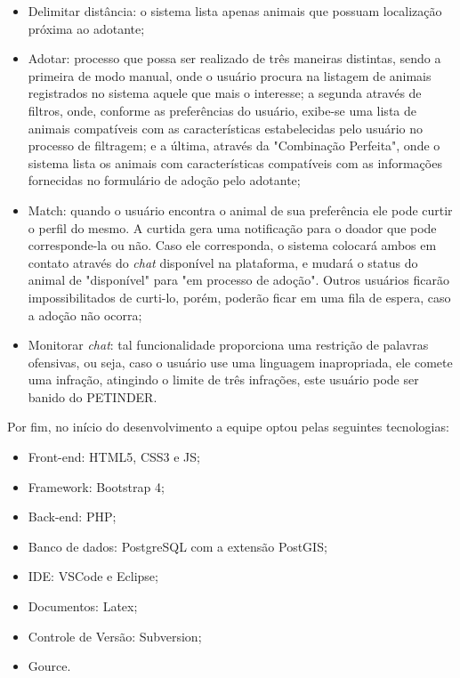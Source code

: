 \begin{itemize}

\item Delimitar distância: o sistema lista apenas animais que possuam localização próxima ao adotante;

\item Adotar: processo que possa ser realizado de três maneiras distintas, sendo a primeira de modo manual, onde o usuário procura na listagem de animais registrados no sistema aquele que mais o interesse; a segunda através de filtros, onde, conforme as preferências do usuário, exibe-se uma lista de animais compatíveis com as características estabelecidas pelo usuário no processo de filtragem; e a última, através da "Combinação Perfeita", onde o sistema lista os animais com características compatíveis com as informações fornecidas no formulário de adoção pelo adotante;

\item \gls{Match}: quando o usuário encontra o animal de sua preferência ele pode curtir o perfil do mesmo. A curtida gera uma notificação para o doador que pode corresponde-la ou não. Caso ele corresponda, o sistema colocará ambos em contato através do \textit{chat} disponível na plataforma, e mudará o status do animal de "disponível" para "em processo de adoção". Outros usuários ficarão impossibilitados de curti-lo, porém, poderão ficar em uma fila de espera, caso a adoção não ocorra;

\item Monitorar \textit{chat}: tal funcionalidade proporciona uma restrição de palavras ofensivas, ou seja, caso  o usuário use uma linguagem inapropriada, ele comete uma infração, atingindo o limite de três infrações, este usuário pode ser banido do PETINDER.

\end{itemize}

Por fim, no início do desenvolvimento a equipe optou pelas seguintes tecnologias: 

\begin{itemize}
\item Front-end: \ac{HTML}5, \ac{CSS}3 e \ac{JS};

\item Framework: \gls{Bootstrap} 4;

\item Back-end: \ac{PHP};

\item Banco de dados: \gls{PostgreSQL} com a extensão \gls{PostGIS};

\item IDE: \gls{VSCode} e \gls{Eclipse};

\item Documentos: \gls{Latex};

\item Controle de Versão: \gls{Subversion};

\item \gls{Gource}.
\end{itemize}


